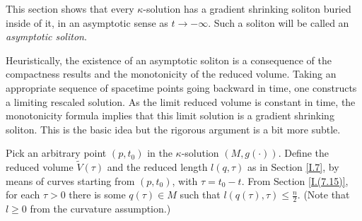 This section shows that every $\kappa$-solution has a gradient shrinking
soliton buried inside of it, in an asymptotic sense as $t \rightarrow -\infty$.
Such a soliton will be called an {\em asymptotic soliton}.

Heuristically, the existence of an asymptotic soliton is
a consequence of the compactness results and
the monotonicity of the reduced volume.  Taking an appropriate
sequence of
spacetime points going backward in time, one constructs a
limiting rescaled solution. As the limit reduced volume
is constant in time, the monotonicity formula implies that
this limit solution is a gradient shrinking soliton. This is
the basic idea but
the rigorous argument is a bit more subtle.

Pick an arbitrary point $(p, t_0)$ in the $\kappa$-solution $(M, g(\cdot))$. Define
the reduced volume $\widetilde{V}(\tau)$ and the reduced length
$l(q, \tau)$ as in Section \ref{I.7}, by means of curves starting from
$(p, t_0)$, with $\tau = t_0 - t$. From
Section \ref{I.(7.15)}, for each $\tau> 0$ there is some
$q(\tau)\in M$ such that $l(q(\tau), \tau) \le \frac{n}{2}$. (Note that
$l \ge 0$ from the curvature assumption.)

